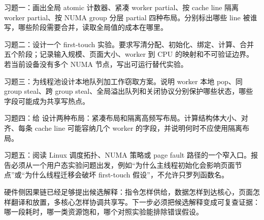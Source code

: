 \begin{exercisebox}
习题一：画出全局 atomic 计数器、紧凑 worker partial、按 cache line 隔离 worker partial、按 NUMA group 分层 partial 四种布局。分别标出哪些 line 被谁写，哪些阶段需要合并，读取全局值的成本在哪里。

习题二：设计一个 first-touch 实验。要求写清分配、初始化、绑定、计算、合并五个阶段；记录输入规模、页面大小、worker 到 CPU 的映射和不可验证边界。若当前设备没有多个 NUMA 节点，写出可运行替代实验。

习题三：为线程池设计本地队列加工作窃取方案。说明 worker 本地 pop、同 group steal、跨 group steal、全局溢出队列和关闭协议分别保护哪些状态，哪些字段可能成为共享写热点。

习题四：给  设计两种布局：紧凑布局和隔离高频写布局。计算结构体大小、对齐、每条 cache line 可能容纳几个 worker 的字段，并说明何时不应使用隔离布局。

习题五：阅读 Linux 调度拓扑、NUMA 策略或 page fault 路径的一个窄入口。报告必须从一个用户态实验问题出发，例如“为什么主线程初始化会影响页面节点”或“为什么线程迁移会破坏 first-touch 假设”，不允许只罗列函数名。
\end{exercisebox}

硬件侧因果链已经足够提出候选解释：指令怎样供给，数据怎样到达核心，页面怎样翻译和放置，多核心怎样协调共享写。下一步必须把候选解释变成可复查证据：哪一段耗时，哪一类资源饱和，哪个对照实验能排除错误假设。
